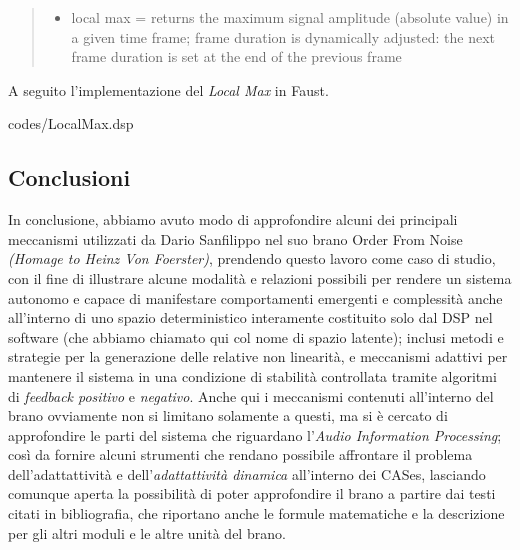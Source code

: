 \begin{quote}
    \begin{itemize}
      \item local max = returns the maximum signal amplitude (absolute value) 
      in a given time frame; frame duration is dynamically adjusted: 
      the next frame duration is set at the end of the previous frame
    \end{itemize}
    \end{quote}

A seguito l'implementazione del \textit{Local Max} in Faust.

\vspace{0.5cm} 

{codes/LocalMax.dsp}

\subsection{Conclusioni}
\label{sec:Conclusioni}

In conclusione, abbiamo avuto modo di approfondire alcuni dei principali meccanismi 
utilizzati da Dario Sanfilippo nel suo brano Order From Noise \textit{(Homage to Heinz Von Foerster)},
prendendo questo lavoro come caso di studio, con il fine di illustrare
alcune modalità e relazioni possibili per rendere un sistema autonomo e 
capace di manifestare comportamenti emergenti e complessità anche all'interno di uno 
spazio deterministico interamente costituito solo dal DSP nel software 
(che abbiamo chiamato qui col nome di spazio latente); 
inclusi metodi e strategie per la generazione delle relative non linearità,
e meccanismi adattivi per mantenere il sistema in una condizione di stabilità
controllata tramite algoritmi di \emph{feedback positivo} e \emph{negativo}.
Anche qui i meccanismi contenuti all'interno del brano ovviamente non si limitano solamente a questi,
ma si è cercato di approfondire le parti del sistema che riguardano l'\textit{Audio Information Processing};
così da fornire alcuni strumenti che rendano possibile affrontare il problema 
dell'adattattività e dell'\textit{adattattività dinamica}
all'interno dei CASes, lasciando comunque aperta la possibilità 
di poter approfondire il brano a partire
dai testi citati in bibliografia, che riportano anche le formule matematiche e la descrizione
per gli altri moduli e le altre unità del brano.